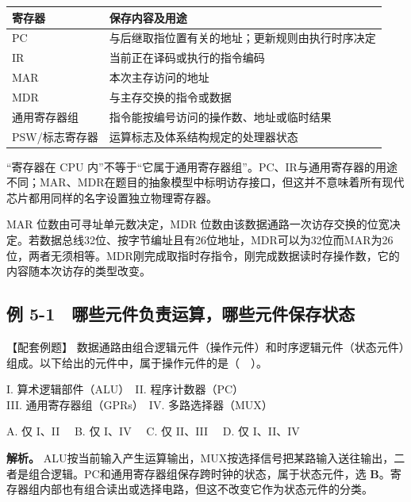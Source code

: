 \par\medskip\noindent\begin{minipage}{\linewidth}\fontsize{9.3}{12}\selectfont\begin{tabularx}{\linewidth}{@{}YY@{}}
\toprule\noalign{}
寄存器 & 保存内容及用途 \\
\midrule\noalign{}


PC & 与后继取指位置有关的地址；更新规则由执行时序决定 \\
IR & 当前正在译码或执行的指令编码 \\
MAR & 本次主存访问的地址 \\
MDR & 与主存交换的指令或数据 \\
通用寄存器组 & 指令能按编号访问的操作数、地址或临时结果 \\
PSW/标志寄存器 & 运算标志及体系结构规定的处理器状态 \\
\bottomrule\end{tabularx}
\end{minipage}\par\medskip

``寄存器在 CPU 内''不等于``它属于通用寄存器组''。PC、IR与通用寄存器的用途不同；MAR、MDR在题目的抽象模型中标明访存接口，但这并不意味着所有现代芯片都用同样的名字设置独立物理寄存器。

MAR 位数由可寻址单元数决定，MDR 位数由该数据通路一次访存交换的位宽决定。若数据总线32位、按字节编址且有26位地址，MDR可以为32位而MAR为26位，两者无须相等。MDR刚完成取指时存指令，刚完成数据读时存操作数，它的内容随本次访存的类型改变。

\subsection{例 5-1　哪些元件负责运算，哪些元件保存状态}\label{CO05-example-1}

\begin{example}[配套辨析]

【配套例题】 数据通路由组合逻辑元件（操作元件）和时序逻辑元件（状态元件）组成。以下给出的元件中，属于操作元件的是（　）。

I. 算术逻辑部件（ALU）　II. 程序计数器（PC）\\
III. 通用寄存器组（GPRs）　IV. 多路选择器（MUX）

A. 仅 I、II　 B. 仅 I、IV　 C. 仅 II、III　 D. 仅 I、II、IV

\end{example}

\textbf{解析。} ALU按当前输入产生运算输出，MUX按选择信号把某路输入送往输出，二者是组合逻辑。PC和通用寄存器组保存跨时钟的状态，属于状态元件，选 \textbf{B}。寄存器组内部也有组合读出或选择电路，但这不改变它作为状态元件的分类。

